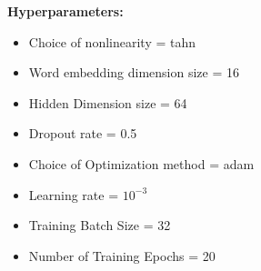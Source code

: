 \documentclass[12pt]{article}
\begin{document}
\textbf{Hyperparameters:}
\begin{itemize}
    \item Choice of nonlinearity = tahn
    \item Word embedding dimension size = 16
    \item Hidden Dimension size = 64
    \item Dropout rate = 0.5 
    \item Choice of Optimization method = adam
    \item Learning rate = $10^{-3}$
    \item Training Batch Size = 32
    \item Number of Training Epochs = 20\\\\\\\\\\\\\\\\\\\\\\
    
\end{itemize}
\end{document}

